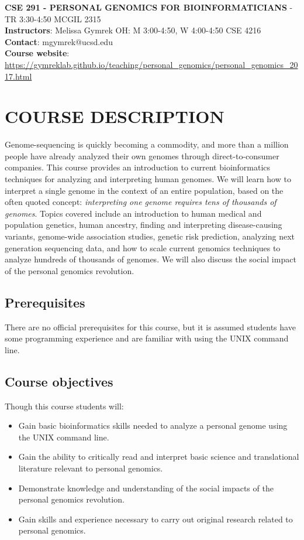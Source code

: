 \documentclass[12pt]{article}
\begin{document}
\textbf{CSE 291 - PERSONAL GENOMICS FOR BIOINFORMATICIANS} - TR 3:30-4:50 MCGIL 2315 \\
\textbf{Instructors}: Melissa Gymrek OH: M 3:00-4:50, W 4:00-4:50 CSE 4216 \\
\textbf{Contact}: mgymrek@ucsd.edu \\
\textbf{Course website}: \href{https://gymreklab.github.io/teaching/personal\_genomics/personal\_genomics\_2017.html}{https://gymreklab.github.io/teaching/personal\_genomics/personal\_genomics\_2017.html} \\

\section*{COURSE DESCRIPTION}
Genome-sequencing is quickly becoming a commodity, and more than a million people have already analyzed their own genomes through direct-to-consumer companies. This course provides an introduction to current bioinformatics techniques for analyzing and interpreting human genomes. We will learn how to interpret a single genome in the context of an entire population, based on the often quoted concept: \emph{interpreting one genome requires tens of thousands of genomes}. Topics covered include an introduction to human medical and population genetics, human ancestry, finding and interpreting disease-causing variants, genome-wide association studies, genetic risk prediction, analyzing next generation sequencing data, and how to scale current genomics techniques to analyze hundreds of thousands of genomes. We will also discuss the social impact of the personal genomics revolution.

\subsection*{Prerequisites}
There are no official prerequisites for this course, but it is assumed students have some programming experience and are familiar with using the UNIX command line.

\subsection*{Course objectives}
Though this course students will:
\begin{itemize}
\setlength\itemsep{0.0em}
\item Gain basic bioinformatics skills needed to analyze a personal genome using the UNIX command line.
\item Gain the ability to critically read and interpret basic science and translational literature relevant to personal genomics.
\item Demonstrate knowledge and understanding of the social impacts of the personal genomics revolution.
\item Gain skills and experience necessary to carry out original research related to personal genomics.
\end{itemize}
\end{document}
